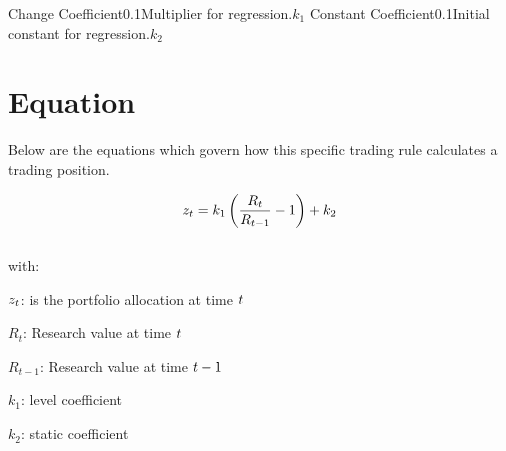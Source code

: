 \documentclass{article}
\begin{document}
\logo
{} %
\tblofcontents



{Change Coefficient}{0.1}{Multiplier for regression.}{$k_1$}
{Constant Coefficient}{0.1}{Initial constant for regression.}{$k_2$}
\stoptable %

\section{Equation}
Below are the equations which govern how this specific trading rule calculates a trading position.

\begin{equation}
z_t = k_{1}\left(\frac{R_t}{R_{t-1}}-1\right)+k_2
\end{equation}
\\ %
with:

$z_t$: is the portfolio allocation at time $t$

$R_t$: Research value at time $t$

$R_{t-1}$: Research value at time $t -1$  

$k_1$: level coefficient

$k_2$: static coefficient

\keyterms
\furtherlinks %
\end{document}

